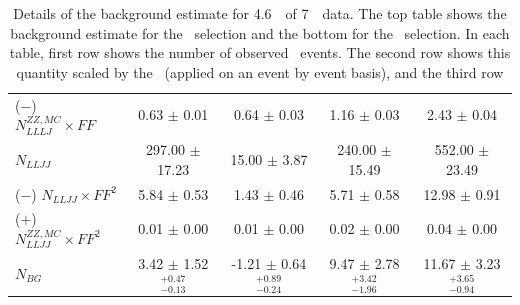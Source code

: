 \begin{table}[htbp]
\begin{tabular}{lcccc}
($-$) $N_{LLLJ}^{ZZ,MC}  \times FF$ &                      0.63 $\pm$ 0.01 &                      0.64 $\pm$ 0.03 &                     1.16 $\pm$ 0.03 &                      2.43 $\pm$ 0.04 \\
$N_{LLJJ}$                          &                   297.00 $\pm$ 17.23 &                     15.00 $\pm$ 3.87 &                  240.00 $\pm$ 15.49 &                   552.00 $\pm$ 23.49 \\
($-$) $N_{LLJJ} \times FF^{2}$      &                      5.84 $\pm$ 0.53 &                      1.43 $\pm$ 0.46 &                     5.71 $\pm$ 0.58 &                     12.98 $\pm$ 0.91 \\
($+$) $N_{LLJJ}^{ZZ,MC}\times FF^2$ &                      0.01 $\pm$ 0.00 &                      0.01 $\pm$ 0.00 &                     0.02 $\pm$ 0.00 &                      0.04 $\pm$ 0.00 \\
\hline                                  
$N_{BG}$                            &  3.42 $\pm$ 1.52 $^{+0.47}_{-0.13}$ &  -1.21 $\pm$ 0.64 $^{+0.89}_{-0.24}$ &  9.47 $\pm$ 2.78 $^{+3.42}_{-1.96}$ &  11.67 $\pm$ 3.23 $^{+3.65}_{-0.94}$ \\
\hline\hline
\end{tabular}
\renewcommand\arraystretch{1.}
\caption{\small Details of the background estimate for 4.6~\ifb\ of 7~\tev\
data. The top table shows the background estimate for the \ZZ\ selection and the
bottom for the \ZZs\ selection. In each table, first row
shows the number of observed \NLLLJ\ events. The second row shows this quantity
scaled by the \ffactor\ (applied on an event by event basis), and the third row
}
\end{table}
